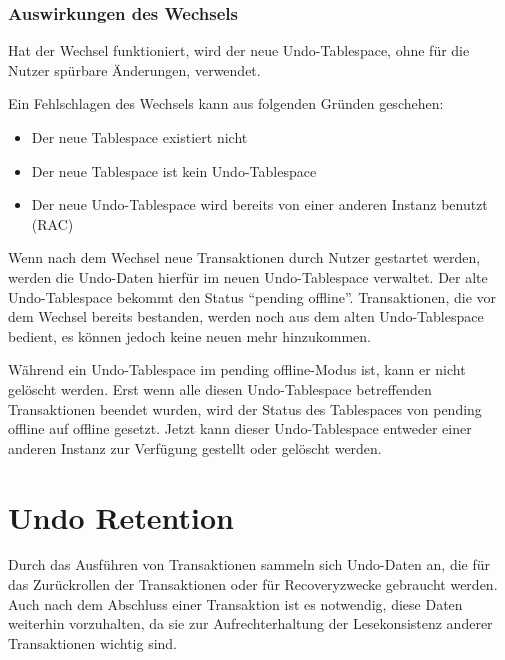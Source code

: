         \subsubsection{Auswirkungen des Wechsels}
          Hat der Wechsel funktioniert, wird der neue Undo-Tablespace, ohne f\"ur die Nutzer sp\"urbare \"Anderungen, verwendet.

          Ein Fehlschlagen des Wechsels kann aus folgenden Gr\"unden geschehen:
          \begin{itemize}
            \item Der neue Tablespace existiert nicht
            \item Der neue Tablespace ist kein Undo-Tablespace
            \item Der neue Undo-Tablespace wird bereits von einer anderen Instanz benutzt (RAC)
          \end{itemize}
          Wenn nach dem Wechsel neue Transaktionen durch Nutzer gestartet werden, werden die Undo-Daten hierf\"ur im neuen Undo-Tablespace verwaltet. Der alte Undo-Tablespace bekommt den Status \enquote{pending offline}. Transaktionen, die vor dem Wechsel bereits bestanden, werden noch aus dem alten Undo-Tablespace bedient, es k\"onnen jedoch keine neuen mehr hinzukommen.

          W\"ahrend ein Undo-Tablespace im pending offline-Modus ist, kann er nicht gel\"oscht werden. Erst wenn alle diesen Undo-Tablespace betreffenden Transaktionen beendet wurden, wird der Status des Tablespaces von pending offline auf offline gesetzt. Jetzt kann dieser Undo-Tablespace entweder einer anderen Instanz zur Verf\"ugung gestellt oder gel\"oscht werden.
    \section{Undo Retention}
      \label{undoretention}
      Durch das Ausf\"uhren von Transaktionen sammeln sich Undo-Daten an, die f\"ur das Zur\"uckrollen der Transaktionen oder f\"ur Recoveryzwecke gebraucht werden. Auch nach dem Abschluss einer Transaktion ist es notwendig, diese Daten weiterhin vorzuhalten, da sie zur Aufrechterhaltung der Lesekonsistenz anderer Transaktionen wichtig sind.

